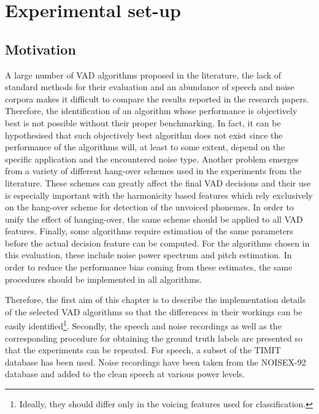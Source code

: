 
\chapter{Experimental set-up} %

\label{Chapter3} %



\section{Motivation}

A large number of VAD algorithms proposed in the literature, the lack of standard methods for their evaluation and an abundance of speech and noise corpora makes it difficult to compare the results reported in the research papers. Therefore, the identification of an algorithm whose performance is objectively best is not possible without their proper benchmarking. In fact, it can be hypothesised that such objectively best algorithm does not exist since the performance of the algorithms will, at least to some extent, depend on the specific application and the encountered noise type. Another problem emerges from a variety of different hang-over schemes used in the experiments from the literature. These schemes can greatly affect the final VAD decisions and their use is especially important with the harmonicity based features which rely exclusively on the hang-over scheme for detection of the unvoiced phonemes. In order to unify the effect of hanging-over, the same scheme should be applied to all VAD features. Finally, some algorithms require estimation of the same parameters before the actual decision feature can be computed. For the algorithms chosen in this evaluation, these include noise power spectrum and pitch estimation. In order to reduce the performance bias coming from these estimates, the same procedures should be implemented in all algorithms.

Therefore, the first aim of this chapter is to describe the implementation details of the selected VAD algorithms so that the differences in their workings can be easily identified\footnote{Ideally, they should differ only in the voicing features used for classification.}. Secondly, the speech and noise recordings as well as the corresponding procedure for obtaining the ground truth labels are presented so that the experiments can be repeated. For speech, a subset of the TIMIT \cite{TIMIT} database has been used. Noise recordings have been taken from the NOISEX-92 \cite{NOISEX} database and added to the clean speech at various power levels.

